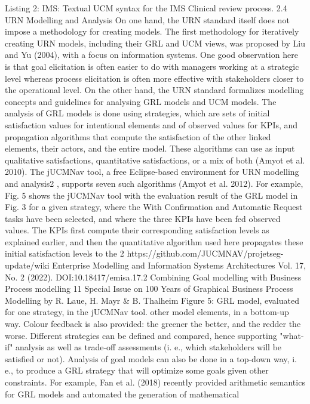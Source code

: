 Listing 2: IMS: Textual UCM syntax for the IMS
Clinical review process.
2.4 URN Modelling and Analysis
On one hand, the URN standard itself does not impose a methodology for creating models. The first
methodology for iteratively creating URN models, including their GRL and UCM views, was
proposed by Liu and Yu (2004), with a focus on
information systems. One good observation here
is that goal elicitation is often easier to do with
managers working at a strategic level whereas
process elicitation is often more effective with
stakeholders closer to the operational level. On
the other hand, the URN standard formalizes modelling concepts and guidelines for analysing GRL
models and UCM models.
The analysis of GRL models is done using
strategies, which are sets of initial satisfaction
values for intentional elements and of observed
values for KPIs, and propagation algorithms that
compute the satisfaction of the other linked elements, their actors, and the entire model. These
algorithms can use as input qualitative satisfactions, quantitative satisfactions, or a mix of both
(Amyot et al. 2010). The jUCMNav tool, a free
Eclipse-based environment for URN modelling
and analysis2 , supports seven such algorithms
(Amyot et al. 2012).
For example, Fig. 5 shows the jUCMNav tool
with the evaluation result of the GRL model in
Fig. 3 for a given strategy, where the With Confirmation and Automatic Request tasks have been
selected, and where the three KPIs have been fed
observed values. The KPIs first compute their
corresponding satisfaction levels as explained earlier, and then the quantitative algorithm used here
propagates these initial satisfaction levels to the
2 https://github.com/JUCMNAV/projetseg-update/wiki
Enterprise Modelling and Information Systems Architectures
Vol. 17, No. 2 (2022). DOI:10.18417/emisa.17.2
Combining Goal modelling with Business Process modelling 11
Special Issue on 100 Years of Graphical Business Process Modelling by R. Laue, H. Mayr & B. Thalheim
Figure 5: GRL model, evaluated for one strategy, in the jUCMNav tool.
other model elements, in a bottom-up way. Colour
feedback is also provided: the greener the better,
and the redder the worse.
Different strategies can be defined and compared, hence supporting "what-if" analysis as well
as trade-off assessments (i. e., which stakeholders
will be satisfied or not).
Analysis of goal models can also be done in
a top-down way, i. e., to produce a GRL strategy
that will optimize some goals given other constraints. For example, Fan et al. (2018) recently
provided arithmetic semantics for GRL models
and automated the generation of mathematical
